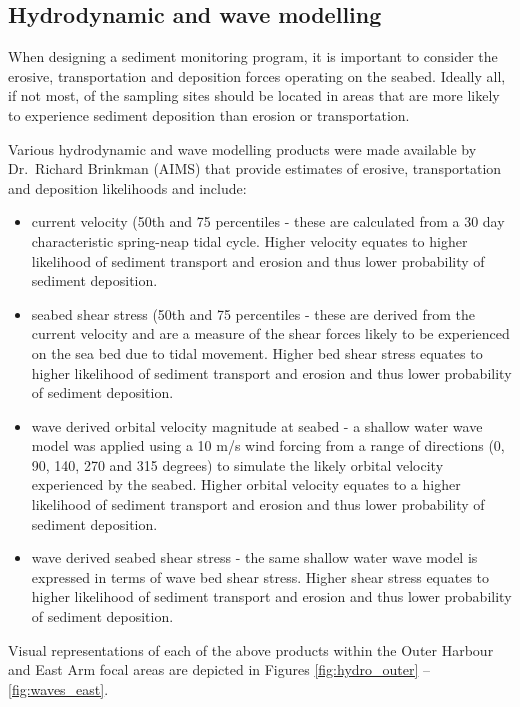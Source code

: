 \documentclass[a4paper]{article}
\begin{document}
\newpage

\hypertarget{hydrodynamic-and-wave-modelling}{%
\subsection{Hydrodynamic and wave
modelling}\label{hydrodynamic-and-wave-modelling}}

When designing a sediment monitoring program, it is important to
consider the erosive, transportation and deposition forces operating on
the seabed. Ideally all, if not most, of the sampling sites should be
located in areas that are more likely to experience sediment deposition
than erosion or transportation.

Various hydrodynamic and wave modelling products were made available by
Dr.~Richard Brinkman (AIMS) that provide estimates of erosive,
transportation and deposition likelihoods and include:

\begin{itemize}
\tightlist
\item
  current velocity (50th and 75 percentiles - these are calculated from
  a 30 day characteristic spring-neap tidal cycle. Higher velocity
  equates to higher likelihood of sediment transport and erosion and
  thus lower probability of sediment deposition.
\item
  seabed shear stress (50th and 75 percentiles - these are derived from
  the current velocity and are a measure of the shear forces likely to
  be experienced on the sea bed due to tidal movement. Higher bed shear
  stress equates to higher likelihood of sediment transport and erosion
  and thus lower probability of sediment deposition.
\item
  wave derived orbital velocity magnitude at seabed - a shallow water
  wave model was applied using a 10 m/s wind forcing from a range of
  directions (0, 90, 140, 270 and 315 degrees) to simulate the likely
  orbital velocity experienced by the seabed. Higher orbital velocity
  equates to a higher likelihood of sediment transport and erosion and
  thus lower probability of sediment deposition.
\item
  wave derived seabed shear stress - the same shallow water wave model
  is expressed in terms of wave bed shear stress. Higher shear stress
  equates to higher likelihood of sediment transport and erosion and
  thus lower probability of sediment deposition.
\end{itemize}

Visual representations of each of the above products within the Outer
Harbour and East Arm focal areas are depicted in Figures
\ref{fig:hydro_outer} -- \ref{fig:waves_east}.
\end{document}
